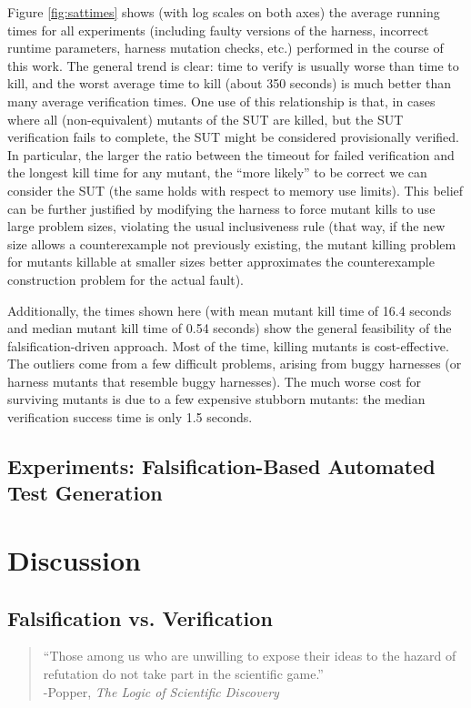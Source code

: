 \documentclass{svjour3}
\begin{document}
Figure \ref{fig:sattimes} shows (with log scales on both axes) the
average running times for all experiments (including faulty versions
of the harness, incorrect runtime parameters, harness mutation checks,
etc.) performed in the course of this work.  The general trend is
clear: time to verify is usually worse than time to kill, and the
worst average time to kill (about 350 seconds) is much better than
many average verification times.  One use of this relationship is
that, in cases where all (non-equivalent) mutants of the SUT are
killed, but the SUT verification fails to complete, the SUT might be
considered provisionally verified. In particular, the larger
the ratio between the timeout for failed verification and the longest
kill time for any mutant, the ``more likely'' to be correct we can
consider the SUT (the same holds with respect to memory use
limits). This belief can be further justified by modifying the harness
to force mutant kills to use large problem sizes, violating the usual
inclusiveness rule (that way, if the new size allows a counterexample
not previously existing, the mutant killing problem for mutants
killable at smaller sizes better approximates the counterexample
construction problem for the actual fault).

Additionally, the times shown here (with mean mutant kill time of 16.4
seconds and median mutant kill time of 0.54 seconds) show the general
feasibility of the falsification-driven approach.  Most of the time,
killing mutants is cost-effective.  The outliers come from a few
difficult problems, arising from buggy harnesses (or harness mutants
that resemble buggy harnesses).  The much worse cost for surviving
mutants is due to a few expensive stubborn mutants: the median
verification success time is only 1.5 seconds.

\subsection{Experiments: Falsification-Based Automated Test Generation}

\section{Discussion}

\subsection{Falsification vs. Verification}

\begin{quote}
``Those among us who are unwilling to expose their ideas to the hazard 
of refutation do not take part in the scientific game.''\\
-Popper, \emph{The Logic of Scientific Discovery} \cite{Popper}
\end{quote}
\end{document}
